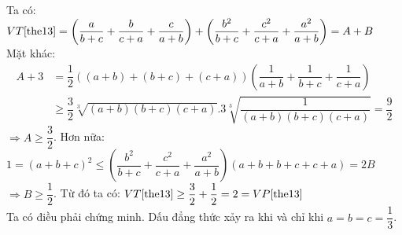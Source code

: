 \lgi
Ta có:
$
VT\eqref{the13} = \left(\dfrac{a}{b+c}+\dfrac{b}{c+a}+\dfrac{c}{a+b}\right) + \left(\dfrac{b^2}{b+c}+\dfrac{c^2}{c+a}+\dfrac{a^2}{a+b}\right)=A+B$\\
Mặt khác:
\begin{align*}
A+3 & =\dfrac{1}{2}\left( (a+b)+(b+c)+(c+a) \right) \left( \dfrac{1}{a+b}+\dfrac{1}{b+c}+\dfrac{1}{c+a}\right) \\
& \geq  \dfrac{3}{2}\sqrt[3]{(a+b)(b+c)(c+a)}.3\sqrt[3]{\dfrac{1}{(a+b)(b+c)(c+a)}} = \dfrac{9}{2}
\end{align*}
$\Rightarrow A \geq \dfrac{3}{2}$.
Hơn nữa:
$1 = (a+b+c)^2 \leq \left(\dfrac{b^2}{b+c}+\dfrac{c^2}{c+a}+\dfrac{a^2}{a+b}\right)(a+b+b+c+c+a) = 2B$\\
$\Rightarrow B \geq \dfrac{1}{2}$.
Từ đó ta có:
$VT\eqref{the13} \geq \dfrac{3}{2}+\dfrac{1}{2}=2 = VP \eqref{the13}$\\
Ta có điều phải chứng minh. Dấu đẳng thức xảy ra khi và chỉ khi $a=b=c=\dfrac{1}{3}$.
